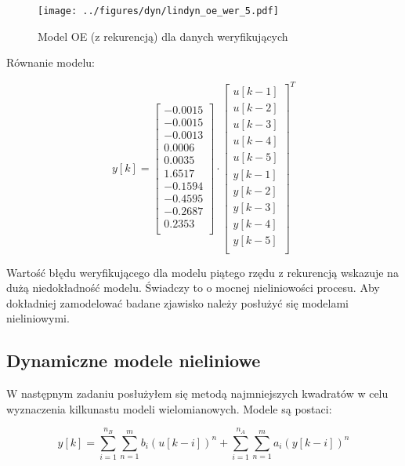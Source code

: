 \documentclass[a4paper,titlepage,11pt,floatssmall]{mwrep}
\begin{document}
\begin{figure}[H]
\centering
\texttt{[image: ../figures/dyn/lindyn\_oe\_wer\_5.pdf]}
\caption{Model OE (z rekurencją) dla danych weryfikujących}
\end{figure}

Równanie modelu:

$$ 
y[k] = 
\left[\begin{array}{c}
   -0.0015 \\
   -0.0015 \\ 
   -0.0013 \\
    0.0006 \\
    0.0035 \\
    1.6517 \\
   -0.1594 \\
   -0.4595 \\
   -0.2687 \\
    0.2353 \\
\end{array} \right]
\cdot
\left[\begin{array}{c}
   u[k-1] \\
   u[k-2] \\
   u[k-3] \\ 
   u[k-4] \\ 
   u[k-5] \\ 
   y[k-1] \\ 
   y[k-2] \\ 
   y[k-3] \\ 
   y[k-4] \\ 
   y[k-5] \\
\end{array} \right]^T
$$


Wartość błędu weryfikującego dla modelu piątego rzędu z rekurencją wskazuje na dużą niedokładność modelu. Świadczy to o mocnej nieliniowości procesu. Aby dokładniej zamodelować badane zjawisko należy posłużyć się modelami nieliniowymi.

\newpage
\subsection{Dynamiczne modele nieliniowe}
W następnym zadaniu posłużyłem się metodą najmniejszych kwadratów w celu wyznaczenia kilkunastu modeli wielomianowych. Modele są postaci:

\begin{equation*}
	y[k] = \sum_{i=1}^{n_B} \sum_{n=1}^{m} b_i (	u[k-i])^n + \sum_{i=1}^{n_A} \sum_{n=1}^{m} a_i (y[k-i])^n
\end{equation*}
\end{document}

